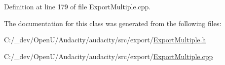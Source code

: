 Definition at line 179 of file Export\+Multiple.\+cpp.



The documentation for this class was generated from the following files\+:\begin{DoxyCompactItemize}
\item 
C\+:/\+\_\+dev/\+Open\+U/\+Audacity/audacity/src/export/\hyperlink{_export_multiple_8h}{Export\+Multiple.\+h}\item 
C\+:/\+\_\+dev/\+Open\+U/\+Audacity/audacity/src/export/\hyperlink{_export_multiple_8cpp}{Export\+Multiple.\+cpp}\end{DoxyCompactItemize}
